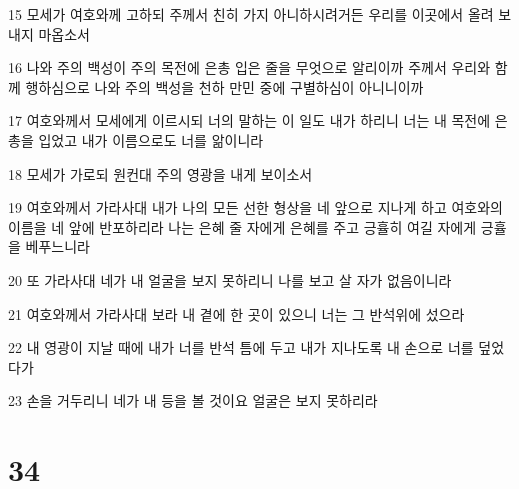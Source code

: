 \par 15 모세가 여호와께 고하되 주께서 친히 가지 아니하시려거든 우리를 이곳에서 올려 보내지 마옵소서
\par 16 나와 주의 백성이 주의 목전에 은총 입은 줄을 무엇으로 알리이까 주께서 우리와 함께 행하심으로 나와 주의 백성을 천하 만민 중에 구별하심이 아니니이까
\par 17 여호와께서 모세에게 이르시되 너의 말하는 이 일도 내가 하리니 너는 내 목전에 은총을 입었고 내가 이름으로도 너를 앎이니라
\par 18 모세가 가로되 원컨대 주의 영광을 내게 보이소서
\par 19 여호와께서 가라사대 내가 나의 모든 선한 형상을 네 앞으로 지나게 하고 여호와의 이름을 네 앞에 반포하리라 나는 은혜 줄 자에게 은혜를 주고 긍휼히 여길 자에게 긍휼을 베푸느니라
\par 20 또 가라사대 네가 내 얼굴을 보지 못하리니 나를 보고 살 자가 없음이니라
\par 21 여호와께서 가라사대 보라 내 곁에 한 곳이 있으니 너는 그 반석위에 섰으라
\par 22 내 영광이 지날 때에 내가 너를 반석 틈에 두고 내가 지나도록 내 손으로 너를 덮었다가
\par 23 손을 거두리니 네가 내 등을 볼 것이요 얼굴은 보지 못하리라

\chapter{34}

